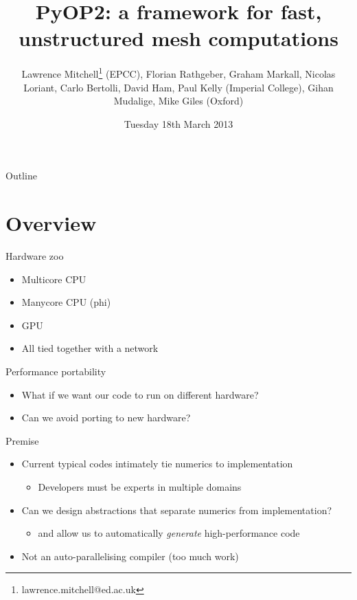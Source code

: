 \documentclass[presentation]{beamer}
\author{Lawrence Mitchell\thanks{lawrence.mitchell@ed.ac.uk} (EPCC), Florian Rathgeber, Graham Markall, Nicolas Loriant, Carlo Bertolli, David Ham, Paul Kelly (Imperial College), Gihan Mudalige, Mike Giles (Oxford)}
\date{Tuesday 18th March 2013}
\title{PyOP2: a framework for fast, unstructured mesh computations}
\begin{document}
\maketitle
\begin{frame}{Outline}
\tableofcontents
\end{frame}


\section{Overview}
\label{sec:orgheadline5}

\begin{frame}[label={sec:orgheadline1}]{Hardware zoo}
\begin{itemize}
\item Multicore CPU
\item Manycore CPU (phi)
\item GPU
\item All tied together with a network
\end{itemize}
\end{frame}

\begin{frame}[label={sec:orgheadline2}]{Performance portability}
\begin{itemize}
\item What if we want our code to run on different hardware?
\item Can we avoid porting to new hardware?
\end{itemize}
\end{frame}

\begin{frame}[label={sec:orgheadline3}]{Premise}
\begin{itemize}
\item Current typical codes intimately tie numerics to implementation
\begin{itemize}
\item Developers must be experts in multiple domains
\end{itemize}
\item Can we design abstractions that separate numerics from
implementation?
\begin{itemize}
\item and allow us to automatically \emph{generate} high-performance code
\end{itemize}
\item Not an auto-parallelising compiler (too much work)
\end{itemize}
\end{frame}
\end{document}
